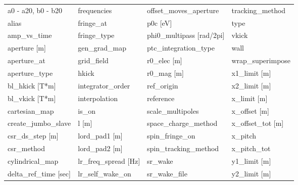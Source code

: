  \begin{tabular}{llll} \toprule
a0 - a20, b0 - b20               & frequencies                      & offset_moves_aperture            & tracking_method                  \\
alias                            & fringe_at                        & p0c [eV]                         & type                             \\
amp_vs_time                      & fringe_type                      & phi0_multipass [rad/2pi]         & vkick                            \\
aperture [m]                     & gen_grad_map                     & ptc_integration_type             & wall                             \\
aperture_at                      & grid_field                       & r0_elec [m]                      & wrap_superimpose                 \\
aperture_type                    & hkick                            & r0_mag [m]                       & x1_limit [m]                     \\
bl_hkick [T*m]                   & integrator_order                 & ref_origin                       & x2_limit [m]                     \\
bl_vkick [T*m]                   & interpolation                    & reference                        & x_limit [m]                      \\
cartesian_map                    & is_on                            & scale_multipoles                 & x_offset [m]                     \\
create_jumbo_slave               & l [m]                            & space_charge_method              & x_offset_tot [m]                 \\
csr_ds_step [m]                  & lord_pad1 [m]                    & spin_fringe_on                   & x_pitch                          \\
csr_method                       & lord_pad2 [m]                    & spin_tracking_method             & x_pitch_tot                      \\
cylindrical_map                  & lr_freq_spread [Hz]              & sr_wake                          & y1_limit [m]                     \\
delta_ref_time [sec]             & lr_self_wake_on                  & sr_wake_file                     & y2_limit [m]                     \\

\end{tabular}
